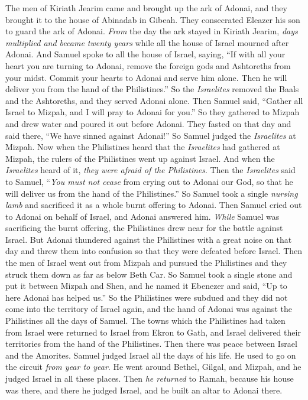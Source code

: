 \begin{biblechapter} %
 The men of Kiriath Jearim came and brought up the ark of Adonai, and they brought it to the house of Abinadab in Gibeah. They consecrated Eleazer his son to guard the ark of Adonai.
\verse \textit{From} the day the ark stayed in Kiriath Jearim, \textit{days multiplied and became twenty years} while all the house of Israel mourned after Adonai.
\verse And Samuel spoke to all the house of Israel, saying, “If with all your heart you are turning to Adonai, remove the foreign gods and Ashtoreths from your midst. Commit your hearts to Adonai and serve him alone. Then he will deliver you from the hand of the Philistines.”
\verse So the \textit{Israelites} removed the Baals and the Ashtoreths, and they served Adonai alone.
\verse Then Samuel said, “Gather all Israel to Mizpah, and I will pray to Adonai for you.”
\verse So they gathered to Mizpah and drew water and poured it out before Adonai. They fasted on that day and said there, “We have sinned against Adonai!” So Samuel judged the \textit{Israelites} at Mizpah.
\verse Now when the Philistines heard that the \textit{Israelites} had gathered at Mizpah, the rulers of the Philistines went up against Israel. And when the \textit{Israelites} heard of it, \textit{they were afraid of the Philistines}.
\verse Then the \textit{Israelites} said to Samuel, “\textit{You must not cease} from crying out to Adonai our God, so that he will deliver us from the hand of the Philistines.”
\verse So Samuel took a single \textit{nursing lamb} and sacrificed it as a whole burnt offering to Adonai. Then Samuel cried out to Adonai on behalf of Israel, and Adonai answered him.
\verse \textit{While} Samuel was sacrificing the burnt offering, the Philistines drew near for the battle against Israel. But Adonai thundered against the Philistines with a great noise on that day and threw them into confusion so that they were defeated before Israel.
\verse Then the men of Israel went out from Mizpah and pursued the Philistines and they struck them down as far as below Beth Car.
\verse So Samuel took a single stone and put it between Mizpah and Shen, and he named it Ebenezer and said, “Up to here Adonai has helped us.”
\verse So the Philistines were subdued and they did not come into the territory of Israel again, and the hand of Adonai was against the Philistines all the days of Samuel.
\verse The towns which the Philistines had taken from Israel were returned to Israel from Ekron to Gath, and Israel delivered their territories from the hand of the Philistines. Then there was peace between Israel and the Amorites.
 Samuel judged Israel all the days of his life.
\verse He used to go on the circuit \textit{from year to year}. He went around Bethel, Gilgal, and Mizpah, and he judged Israel in all these places.
\verse Then \textit{he returned} to Ramah, because his house was there, and there he judged Israel, and he built an altar to Adonai there.
\end{biblechapter}

